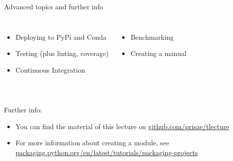 \documentclass[usepdftitle=false, aspectratio=169]{beamer}
\begin{document}
\begin{frame}
  {Advanced topics and further info}

  \begin{columns}[c]
      \begin{itemize}
        \item Deploying to PyPi and Conda
        \item Testing (plus linting, coverage)
        \item Continuous Integration
      \end{itemize}

      \begin{itemize}
        \item Benchmarking
        \item Creating a manual
      \end{itemize}

  \end{columns}

  ~\\[.5cm]
  Further info:
  \begin{itemize}
    \item You can find the material of this lecture on
      \href{https://github.com/prisae/tlecture}{github.com/prisae/tlecture}
    \item For more information about creating a module, see
  \href{https://packaging.python.org/en/latest/tutorials/packaging-projects/}%
       {packaging.python.org/en/latest/tutorials/packaging-projects}
  \end{itemize}

\end{frame}
\end{document}
